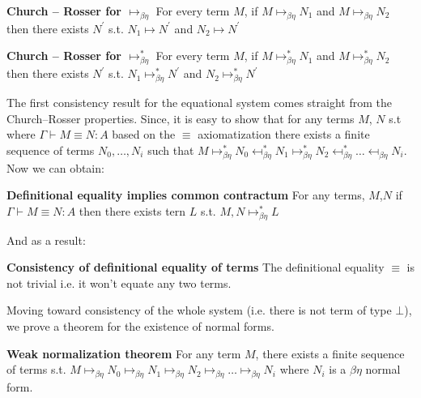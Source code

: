 \begin{mdframed}
	\begin{theorem}	\textbf{Church -- Rosser for $\mapsto_{\beta\eta}$}
		For every term $M$, if $M\mapsto_{\beta\eta} N_1$ and $M \mapsto_{\beta\eta} N_2$ then there exists $N^{'}$ s.t. $N_1 \mapsto N^{'}$ and $N_2\mapsto N^{'}$
		
	\end{theorem}	
	\begin{theorem}	\textbf{Church -- Rosser for $\mapsto_{\beta\eta}^{*}$}
		For every term $M$, if $M\mapsto_{\beta\eta}^{*} N_1$ and $M \mapsto_{\beta\eta}^{*} N_2$ then there exists $N^{'}$ s.t. $N_1 \mapsto_{\beta\eta}^{*} N^{'}$ and $N_2\mapsto_{\beta\eta}^{*} N^{'}$
		
	\end{theorem}	
\end{mdframed}
 The first consistency result for the equational system comes straight from the Church--Rosser properties. Since, it is  easy to show that for any terms $M$, $N$ s.t where $\Gamma\vdash M\equiv N: A$ based on the $\equiv$ axiomatization there exists a finite sequence of terms $N_0,\ldots, N_i$ such that $M\mapsto_{\beta\eta}^{*}N_0\mapsfrom_{\beta\eta}^{*} N_1\mapsto_{\beta\eta}^{*} N_2\mapsfrom_{\beta\eta}^{*}\ldots \mapsfrom_{\beta\eta} N_i$. Now we can obtain:
 \begin{mdframed}
 \begin{theorem}	\textbf{Definitional equality implies common contractum}
 	For any terms, $M$,$N$ if $\Gamma\vdash M\equiv N:A$ then there exists tern $L$ s.t. $M,N\mapsto_{\beta\eta}^{*} L$
 	
 \end{theorem}
\end{mdframed}
 And as a result:
 \begin{mdframed}	
 \begin{theorem}	\textbf{Consistency of definitional equality of terms}
 	The definitional equality $\equiv$ is not trivial i.e. it won't equate any two terms.
 \end{theorem}	
\end{mdframed}
Moving toward consistency of the whole system (i.e. there is not term of type $\bot$), we prove a theorem for the existence of normal forms.
\begin{mdframed}	
\begin{theorem}	\textbf{Weak normalization theorem}
For any term $M$, there exists a finite sequence of terms s.t. $M\mapsto_{\beta\eta}N_0\mapsto_{\beta\eta} N_1\mapsto_{\beta\eta} N_2\mapsto_{\beta\eta}\ldots \mapsto_{\beta\eta} N_i$ where $N_i$ is a $\beta\eta$ normal form.
\end{theorem}	
\end{mdframed}
